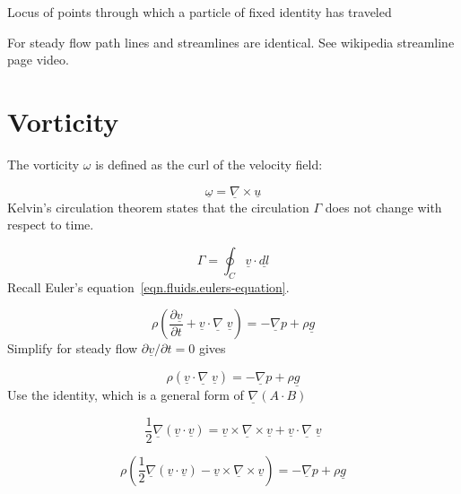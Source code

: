 \begin{defn-dan}[Pathline]
  Locus of points through which a particle of fixed identity has traveled
\end{defn-dan}

For steady flow path lines and streamlines are identical.
See wikipedia streamline page video.

\chapter{Vorticity}

The vorticity $\omega$ is defined as the curl of the velocity field:

\begin{equation*}
  \underline{\omega}=\underline{\nabla}\times\underline{u}
\end{equation*}
Kelvin's circulation theorem states that the circulation $\Gamma$ does not change with respect to time.

\begin{equation*}
  \Gamma=\oint_{C}\underline{v}\cdot\underline{dl}
\end{equation*}
Recall Euler's equation\ \eqref{eqn.fluids.eulers-equation}.

\begin{equation*}
  \rho\left(\frac{\partial\underline{v}}{\partial{}t}+\underline{v}\cdot\underline{\nabla}\;\underline{v}\right)=-\underline{\nabla}p+\rho\underline{g}
\end{equation*}
Simplify for steady flow $\partial\underline{v}/\partial{}t=0$ gives

\begin{equation*}
  \rho(\underline{v}\cdot\underline{\nabla}\;\underline{v})=-\underline{\nabla}p+\rho\underline{g}
\end{equation*}
Use the identity, which is a general form of $\underline{\nabla}(A\cdot B)$

\begin{equation*}
  \frac{1}{2}\underline{\nabla}(\underline{v}\cdot\underline{v})=\underline{v}\times\underline{\nabla}\times\underline{v}+\underline{v}\cdot\underline{\nabla}\;\underline{v}
\end{equation*}

\begin{equation*}
  \rho\left(\frac{1}{2}\underline{\nabla}(\underline{v}\cdot\underline{v})-\underline{v}\times\underline{\nabla}\times\underline{v}\right)=-\underline{\nabla}p+\rho\underline{g}
\end{equation*}

